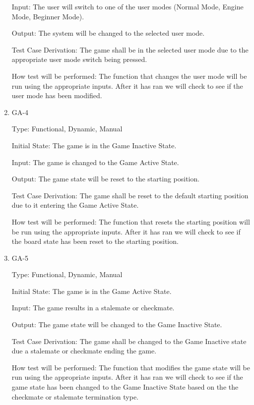 \documentclass[12pt, titlepage]{article}
\begin{document}
\begin{enumerate}
  Input: The user will switch to one of the user modes (Normal Mode, Engine Mode, Beginner Mode).
  
  Output: The system will be changed to the selected user mode.
                      
  Test Case Derivation: The game shall be in the selected user mode due to the appropriate user mode switch being pressed.
  
  How test will be performed: The function that changes the user mode will be run using the appropriate inputs.
  After it has ran we will check to see if the user mode has been modified.
  
  \item{GA-4\\}
  
  Type: Functional, Dynamic, Manual
                      
  Initial State: The game is in the Game Inactive State.
                      
  Input: The game is changed to the Game Active State.
  
  Output: The game state will be reset to the starting position.
                      
  Test Case Derivation: The game shall be reset to the default starting position due to it entering the Game Active State.
  
  How test will be performed: The function that resets the starting position will be run using the appropriate inputs.
  After it has ran we will check to see if the board state has been reset to the starting position.
  
  \item{GA-5\\}
  
  Type: Functional, Dynamic, Manual
                      
  Initial State: The game is in the Game Active State.
                      
  Input: The game results in a stalemate or checkmate.
  
  Output: The game state will be changed to the Game Inactive State.
                      
  Test Case Derivation: The game shall be changed to the Game Inactive state due a stalemate or checkmate ending the game.
  
  How test will be performed: The function that modifies the game state will be run using the appropriate inputs.
  After it has ran we will check to see if the game state has been changed to the Game Inactive State based on the
  the checkmate or stalemate termination type.
  
  \end{enumerate}
  
\end{document}
